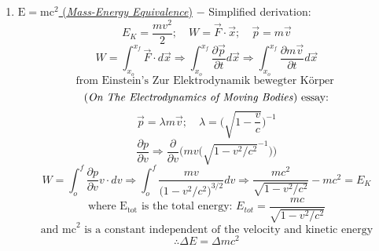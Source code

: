 \documentclass[12pt]{article}
\begin{document}
\begin{flushleft}
\begin{enumerate}
\item \underline{$\text{E}=\text{mc}^\text{2}$ (\emph{Mass-Energy Equivalence})} $-$ Simplified derivation:
$$E_K = \frac{mv^2}{2}; \quad W=\vec{F}\cdot \vec{x}; \quad \vec{p} = m\vec{v} $$ 
$$ W = \int_{x_o}^{x_f}\vec{F}\cdot d\vec{x} \Rightarrow \int_{x_o}^{x_f}\frac{\partial\vec{p}}{\partial t} d\vec{x} \Rightarrow \int_{x_o}^{x_f}\frac{\partial m\vec{v}}{\partial t} d\vec{x} $$ 
$$ \text{from Einstein's Zur Elektrodynamik bewegter K\"orper }$$
$$\text{(\emph{On The Electrodynamics of Moving Bodies}) essay:}$$
$$\vec{p} = \lambda m\vec{v}; \quad \lambda = \biggl(\sqrt{1-\frac{v}{c}}\biggr)^{-1} $$
$$ \frac{\partial p}{\partial v} \Rightarrow \frac{\partial}{\partial v}\biggl(mv\biggl(\sqrt{1-v^2/c^2}^{-1}\biggr)\biggr) $$
$$ W = \int_o^f\frac{\partial p}{\partial v} v\cdot dv \Rightarrow \int_o^f\frac{mv}{\biggl(1-v^2/c^2\biggr)^{3/2}} dv \Rightarrow \frac{mc^2}{\sqrt{1-v^2/c^2}}-mc^2 = E_K $$
$$ \text{where $\text{E}_\text{tot}$ is the total energy: } E_{tot} = \frac{mc}{\sqrt{1-v^2/c^2}} $$
$$ \text{and mc}^\text{2} \text{ is a constant independent of the velocity and kinetic energy} $$ 
$$ \therefore \Delta E = \Delta mc^2 $$

\end{enumerate}
\end{flushleft}
\end{document}
